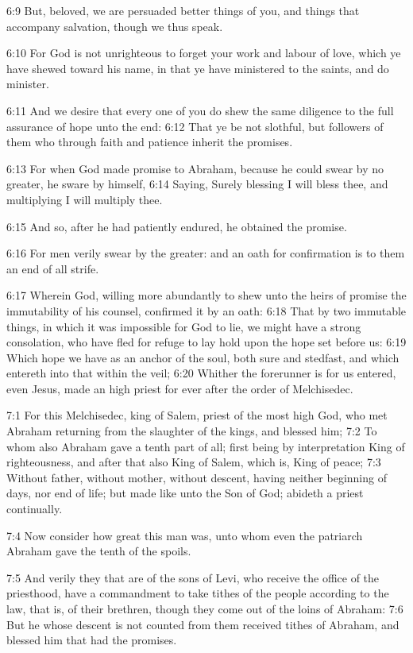 6:9 But, beloved, we are persuaded better things of you, and things that accompany salvation, though we thus speak.

6:10 For God is not unrighteous to forget your work and labour of love, which ye have shewed toward his name, in that ye have ministered to the saints, and do minister.

6:11 And we desire that every one of you do shew the same diligence to the full assurance of hope unto the end: 6:12 That ye be not slothful, but followers of them who through faith and patience inherit the promises.

6:13 For when God made promise to Abraham, because he could swear by no greater, he sware by himself, 6:14 Saying, Surely blessing I will bless thee, and multiplying I will multiply thee.

6:15 And so, after he had patiently endured, he obtained the promise.

6:16 For men verily swear by the greater: and an oath for confirmation is to them an end of all strife.

6:17 Wherein God, willing more abundantly to shew unto the heirs of promise the immutability of his counsel, confirmed it by an oath: 6:18 That by two immutable things, in which it was impossible for God to lie, we might have a strong consolation, who have fled for refuge to lay hold upon the hope set before us: 6:19 Which hope we have as an anchor of the soul, both sure and stedfast, and which entereth into that within the veil; 6:20 Whither the forerunner is for us entered, even Jesus, made an high priest for ever after the order of Melchisedec.

7:1 For this Melchisedec, king of Salem, priest of the most high God, who met Abraham returning from the slaughter of the kings, and blessed him; 7:2 To whom also Abraham gave a tenth part of all; first being by interpretation King of righteousness, and after that also King of Salem, which is, King of peace; 7:3 Without father, without mother, without descent, having neither beginning of days, nor end of life; but made like unto the Son of God; abideth a priest continually.

7:4 Now consider how great this man was, unto whom even the patriarch Abraham gave the tenth of the spoils.

7:5 And verily they that are of the sons of Levi, who receive the office of the priesthood, have a commandment to take tithes of the people according to the law, that is, of their brethren, though they come out of the loins of Abraham: 7:6 But he whose descent is not counted from them received tithes of Abraham, and blessed him that had the promises.

